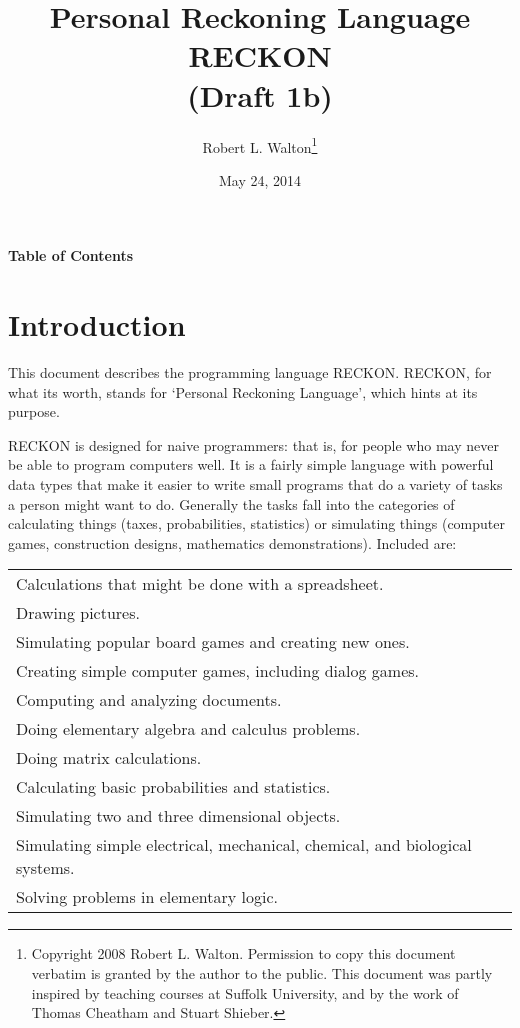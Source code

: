 \documentclass[12pt]{article}
\makeatletter
\renewcommand\tableofcontents{%
    \begin{list}{}%
	     {\setlength{\itemsep}{0in}%
	      \setlength{\topsep}{0in}%
	      \setlength{\parsep}{1ex}%
	      \setlength{\labelwidth}{0in}%
	      \setlength{\baselineskip}{1.5ex}%
	      \setlength{\leftmargin}{0.8in}%
	      \setlength{\rightmargin}{0.8in}}%
    \item\@starttoc{toc}%
    \end{list}}
\makeatother
\begin{document}
        
\title{Personal Reckoning Language\\[2ex]
       RECKON\\[2ex]
       (Draft 1b)}

\author{Robert L. Walton\thanks{Copyright 2008 Robert L. Walton.
Permission to copy this document verbatim is granted by the author
to the public.  This document was partly inspired
by teaching courses at Suffolk University, and by the work of Thomas
Cheatham and Stuart Shieber.}}

\date{May 24, 2014}

\maketitle

\newpage
\begin{center}
\large \bf Table of Contents
\end{center}

\bigskip

\tableofcontents 

\newpage

\section{Introduction}

This document describes the programming language RECKON.  RECKON,
for what its worth, stands for `Personal Reckoning Language',
which hints at its purpose.

RECKON is designed for naive programmers: that is, for people who may never
be able to program computers well.  It is a fairly simple language with
powerful data types that make it easier to write small programs
that do a variety of tasks a person might want to do.  Generally
the tasks fall into the categories of calculating things (taxes,
probabilities, statistics) or simulating things
(computer games, construction designs, mathematics demonstrations).
Included are:

\begin{center}
\begin{tabular}{l}
Calculations that might be done with a spreadsheet. \\
Drawing pictures. \\
Simulating popular board games and creating new ones. \\
Creating simple computer games, including dialog games. \\
Computing and analyzing documents. \\
Doing elementary algebra and calculus problems. \\
Doing matrix calculations. \\ 
Calculating basic probabilities and statistics. \\
Simulating two and three dimensional objects. \\
Simulating simple electrical, mechanical, chemical, and biological systems.\\
Solving problems in elementary logic. \\
\end{tabular}
\end{center}
\end{document}
